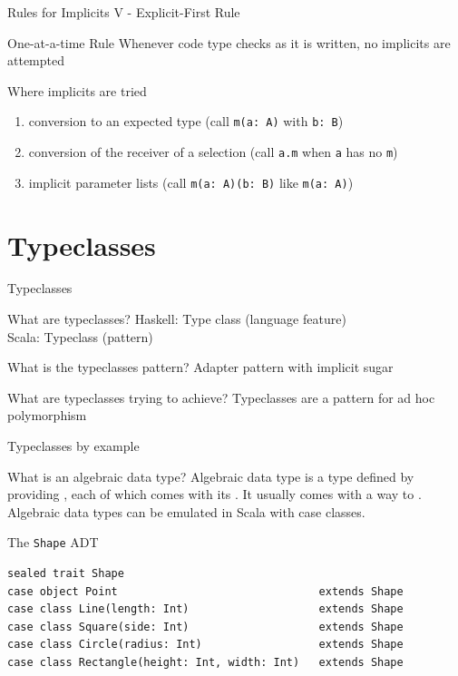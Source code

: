 \begin{frame}[fragile]{Rules for Implicits V - Explicit-First Rule}
\begin{block}{One-at-a-time Rule}
Whenever code type checks as it is written, no implicits are attempted
\end{block}
\begin{block}{Where implicits are tried}
\begin{enumerate}
  \item conversion to an expected type (call \lstinline!m(a: A)! with \lstinline!b: B!)
  \item conversion of the receiver of a selection (call \lstinline!a.m! when \lstinline!a! has no \lstinline!m!)
  \item implicit parameter lists (call \lstinline!m(a: A)(b: B)! like \lstinline!m(a: A)!)
\end{enumerate}
\end{block}
\end{frame}

\section{Typeclasses}
\begin{frame}[fragile]{Typeclasses}
\begin{block}{What are typeclasses?}
Haskell: Type class (language feature)\\
Scala: Typeclass (pattern)
\end{block}
\begin{block}{What is the typeclasses pattern?}
Adapter pattern with implicit sugar
\end{block}
\begin{block}{What are typeclasses trying to achieve?}
Typeclasses are a pattern for  ad hoc polymorphism
\end{block}

\end{frame}

\begin{frame}[fragile]{Typeclasses by example}
\begin{block}{What is an algebraic data type?}
Algebraic data type is a type defined by providing , each of which comes with its . It
usually comes with a way to . Algebraic data types can be emulated in Scala with case classes.
\end{block}
\begin{exampleblock}{The \lstinline!Shape! ADT}
\begin{lstlisting}
sealed trait Shape
case object Point								extends Shape
case class Line(length: Int)					extends Shape
case class Square(side: Int)					extends Shape
case class Circle(radius: Int)					extends Shape
case class Rectangle(height: Int, width: Int)	extends Shape
\end{lstlisting}
\end{exampleblock}
\end{frame}

